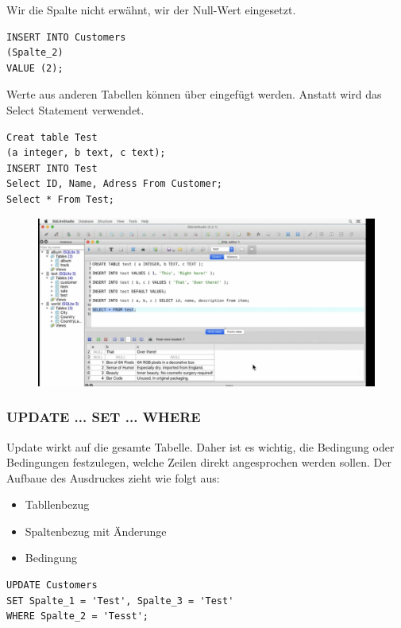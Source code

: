 Wir die Spalte nicht erwähnt, wir der Null-Wert eingesetzt.

\begin{lstlisting}[style=SQL]
INSERT INTO Customers
(Spalte_2)
VALUE (2);
\end{lstlisting}

Werte aus anderen Tabellen können über  eingefügt werden.
Anstatt  wird das Select Statement verwendet.

\begin{lstlisting}[style=SQL]
Creat table Test 
(a integer, b text, c text);
INSERT INTO Test
Select ID, Name, Adress From Customer;
Select * From Test;
\end{lstlisting}

\begin{figure}[H]
	\centering
	\includegraphics[scale = 0.3]{attachment/chapter_3/Scc057}
	\caption{}
	\label{fig:Scc057}
\end{figure}

\subsubsection{UPDATE ... SET ... WHERE}
Update wirkt auf die gesamte Tabelle. Daher ist es wichtig, die Bedingung oder Bedingungen festzulegen, welche Zeilen direkt angesprochen werden sollen.
Der Aufbaue des Ausdruckes zieht wie folgt aus:
\begin{itemize}
\item Tabllenbezug
\item {} Spaltenbezug mit Änderunge
\item {} Bedingung 
\end{itemize}

\begin{lstlisting}[style=SQL]
UPDATE Customers
SET Spalte_1 = 'Test', Spalte_3 = 'Test'
WHERE Spalte_2 = 'Tesst';
\end{lstlisting}

